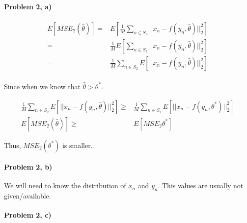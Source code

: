 \documentclass[11pt]{article}
\begin{document}
\paragraph{\noindent\textbf{\LARGE{Problem 2, a)}}}  
  
\begin{equation*}
\begin{split}
    E[MSE_{2} (\hat{\theta})]  = & E[\frac{1}{M} \sum_{n \in S_2 }||x_n - f(y_n, \hat{\theta} )||^2_2] \\
            = &  \frac{1}{M} E[ \sum_{n \in S_2 }||x_n - f(y_n, \hat{\theta} )||^2_2] \\
            = &  \frac{1}{M} \sum_{n \in S_2 } E[ ||x_n - f(y_n, \hat{\theta} )||^2_2] \\
\end{split}
\end{equation*}
\begin{flushleft}
    Since when we know that $\hat{\theta} > \theta^*$.
\end{flushleft}  
\begin{equation*}
\begin{split}
    \frac{1}{M} \sum_{n \in S_2 } E[ ||x_n - f(y_n, \hat{\theta} )||^2_2] \geq & \frac{1}{M} \sum_{n \in S_2 } E[ ||x_n - f(y_n,\theta^* )||^2_2] \\
    E[MSE_2(\hat{\theta})] \geq & E[MSE_2 \theta^*]
\end{split}
\end{equation*}
\begin{flushleft}
    Thus, $MSE_2(\theta^*)$ is smaller.
\end{flushleft}  

\paragraph{\noindent\textbf{\LARGE{Problem 2, b)}}}  
  
\begin{flushleft}
    We will need to know the distribution of $x_n$ and $y_n$. This values are usually not given/available.
\end{flushleft}  

\paragraph{\noindent\textbf{\LARGE{Problem 2, c)}}}  
  
\end{document}
